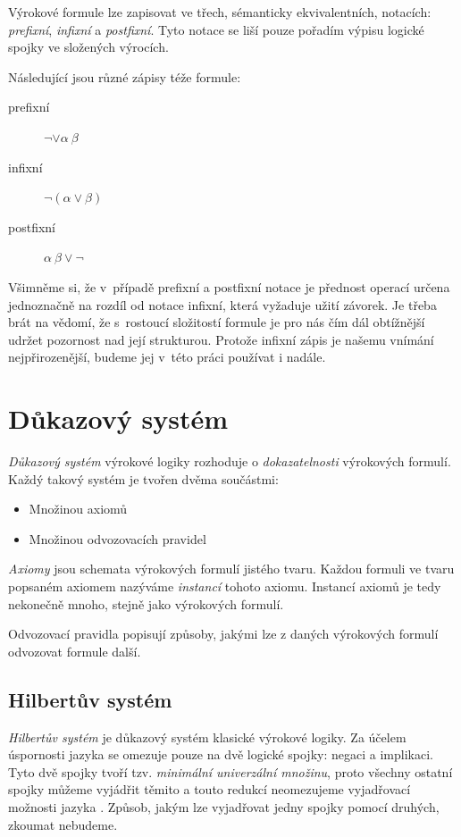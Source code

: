 \documentclass[thesis=B,czech,hidelinks]{thesis}[2012/06/26]
\begin{document}
Výrokové formule lze zapisovat ve třech, sémanticky ekvivalentních, notacích: \emph{prefixní}, \emph{infixní} a \emph{postfixní}. Tyto notace se liší pouze pořadím výpisu logické spojky ve složených výrocích.

\begin{exm}
Následující jsou různé zápisy téže formule:
\begin{description}
	\item[prefixní] $\neg \vee \alpha \: \beta$
	\item[infixní] $\neg (\alpha \vee \beta)$
	\item[postfixní] $\alpha \: \beta \vee \neg$
\end{description}
\end{exm}

Všimněme si, že v~případě prefixní a postfixní notace je přednost operací určena jednoznačně na rozdíl od notace infixní, která vyžaduje užití závorek. Je třeba brát na vědomí, že s~rostoucí složitostí formule je pro nás čím dál obtížnější udržet pozornost nad její strukturou. Protože infixní zápis je našemu vnímání nejpřirozenější, budeme jej v~této práci používat i nadále.

\section{Důkazový systém}
\label{sec:proof_system}

\emph{Důkazový systém} výrokové logiky rozhoduje o \emph{dokazatelnosti} výrokových formulí. Každý takový systém je tvořen dvěma součástmi:

\begin{itemize}
	\item Množinou axiomů
	\item Množinou odvozovacích pravidel
\end{itemize}

\emph{Axiomy} jsou schemata výrokových formulí jistého tvaru. Každou formuli ve tvaru popsaném axiomem nazýváme \emph{instancí} tohoto axiomu. Instancí axiomů je tedy nekonečně mnoho, stejně jako výrokových formulí.

Odvozovací pravidla popisují způsoby, jakými lze z daných výrokových formulí odvozovat formule další.

\subsection{Hilbertův systém}

\emph{Hilbertův systém} je důkazový systém klasické výrokové logiky. Za účelem úspornosti jazyka se omezuje pouze na dvě logické spojky: negaci a implikaci. Tyto dvě spojky tvoří tzv. \emph{minimální univerzální množinu}, proto všechny ostatní spojky můžeme vyjádřit těmito a touto redukcí neomezujeme vyjadřovací možnosti jazyka \cite{logika}. Způsob, jakým lze vyjadřovat jedny spojky pomocí druhých, zkoumat nebudeme.
\end{document}
